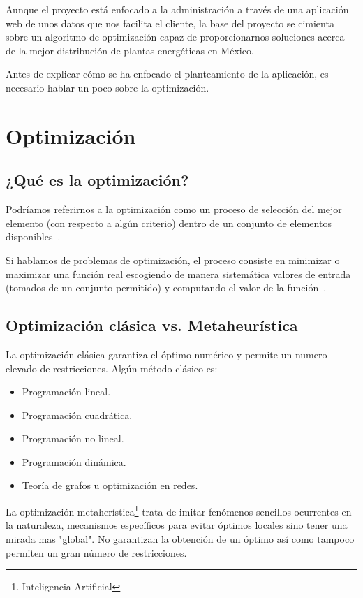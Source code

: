 
Aunque el proyecto está enfocado a la administración a través de una aplicación web de unos datos que nos facilita el cliente, la base del proyecto se cimienta sobre un algoritmo de optimización capaz de proporcionarnos soluciones acerca de la mejor distribución de plantas energéticas en México. 

Antes de explicar cómo se ha enfocado el planteamiento de la aplicación, es necesario hablar un poco sobre la optimización.

\section{Optimización}

\subsection{¿Qué es la optimización?}

Podríamos referirnos a la optimización como un proceso de selección del mejor elemento (con respecto a algún criterio) dentro de un conjunto de elementos disponibles~\cite{wiki:optimizacion}.

Si hablamos de problemas de optimización, el proceso consiste en minimizar o maximizar una función real escogiendo de manera sistemática valores de entrada (tomados de un conjunto permitido) y computando el valor de la función~\cite{wiki:optimizacion}.

\subsection{Optimización clásica vs. Metaheurística}

La optimización clásica garantiza el óptimo numérico y permite un numero elevado de restricciones. Algún método clásico es:
\begin{itemize}
	\item Programación lineal.
	\item Programación cuadrática.
	\item Programación no lineal.
	\item Programación dinámica.
	\item Teoría de grafos u optimización en redes.
\end{itemize}

La optimización metaherística\footnote{Inteligencia Artificial} trata de imitar fenómenos sencillos ocurrentes en la naturaleza, mecanismos específicos para evitar óptimos locales sino tener una mirada mas "global". No garantizan la obtención de un óptimo así como tampoco permiten un gran número de restricciones.

